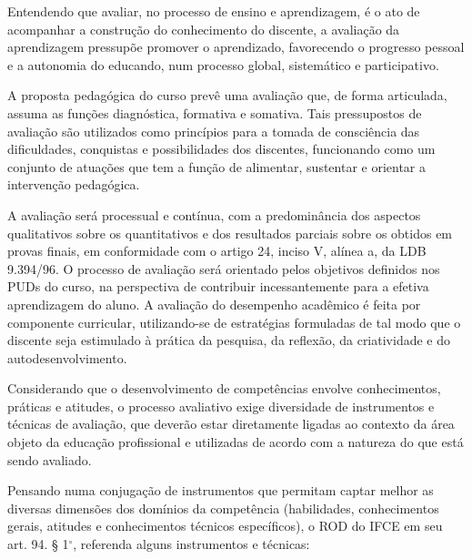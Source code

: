 \documentclass[
	12pt,				%
	openright,			%
	twoside,			%
	a4paper,			%
	chapter=TITLE,		%
	english,			%
	french,				%
	spanish,			%
	brazil,				%
	]{abntex2}
\begin{document}
Entendendo que avaliar, no processo de ensino e aprendizagem, é o ato de acompanhar a construção do conhecimento do discente, a avaliação da aprendizagem pressupõe promover o aprendizado, favorecendo o progresso pessoal e a autonomia do educando, num processo global, sistemático e participativo.

A proposta pedagógica do curso prevê uma avaliação que, de forma articulada, assuma as funções diagnóstica, formativa e somativa. Tais pressupostos de avaliação são utilizados como princípios para a tomada de consciência das dificuldades, conquistas e possibilidades dos discentes, funcionando como um conjunto de atuações que tem a função de alimentar, sustentar e orientar a intervenção pedagógica.

A avaliação será processual e contínua, com a predominância dos aspectos qualitativos sobre os quantitativos e dos resultados parciais sobre os obtidos em provas finais, em conformidade com o artigo 24, inciso V, alínea a, da LDB 9.394/96. O processo de avaliação será orientado pelos objetivos definidos nos PUDs do curso, na perspectiva de contribuir incessantemente para a efetiva aprendizagem do aluno. A avaliação do desempenho acadêmico é feita por componente curricular, utilizando-se de estratégias formuladas de tal modo que o discente seja estimulado à prática da pesquisa, da reflexão, da criatividade e do autodesenvolvimento.


Considerando que o desenvolvimento de competências envolve conhecimentos, práticas e atitudes, o processo avaliativo exige diversidade de instrumentos e técnicas de avaliação, que deverão estar diretamente ligadas ao contexto da área objeto da educação profissional e utilizadas de acordo com a natureza do que está sendo avaliado.

Pensando numa conjugação de instrumentos que permitam captar melhor as diversas dimensões dos domínios da competência (habilidades, conhecimentos gerais, atitudes e conhecimentos técnicos específicos), o ROD do IFCE em seu art. 94. § 1$^\circ$, referenda alguns instrumentos e técnicas:
\end{document}
